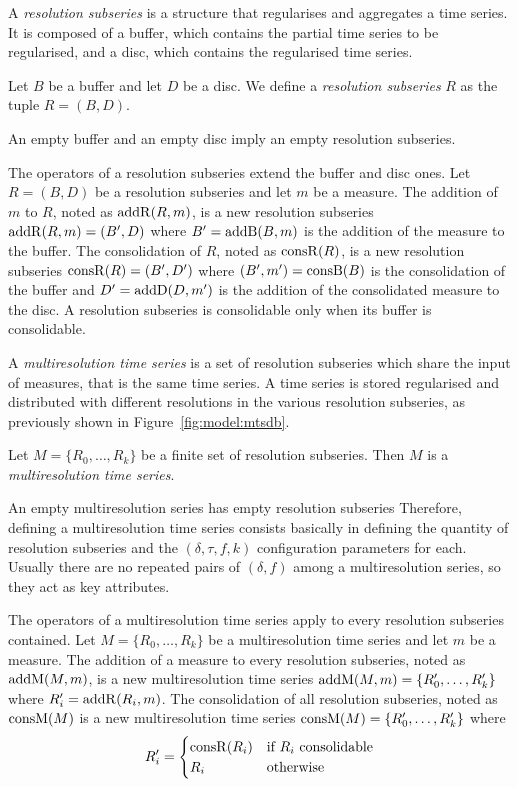 A \emph{resolution subseries} is a structure that regularises and
aggregates a time series. It is composed of a buffer, which contains
the partial time series to be regularised, and a disc, which contains
the regularised time series.
\begin{definition}%
  Let $B$ be a buffer and let $D$ be a disc.  We define a
  \emph{resolution subseries} $R$ as the tuple $R=(B,D)$.  
\end{definition}
 
An empty buffer and an empty disc imply an empty resolution subseries. 


The operators of a resolution subseries extend the buffer and disc
ones. Let $R=(B,D)$ be a resolution subseries and let $m$ be a
measure.  The addition of $m$ to $R$, noted as $\operatorname{addR}(R,m)$, is a new
resolution subseries $\operatorname{addR}(R,m)=(B',D)$ where $B'= \operatorname{addB}(B,m)$ is the
addition of the measure to the buffer.  The consolidation of $R$,
noted as $\operatorname{consR}(R)$, is a new resolution subseries
$\operatorname{consR}(R)=(B',D')$ where $(B',m') = \operatorname{consB}(B)$ is the consolidation
of the buffer and $D'= \operatorname{addD}(D,m')$ is the addition of the
consolidated measure to the disc. A resolution subseries is
consolidable only when its buffer is consolidable.




A \emph{multiresolution time series} is a set of resolution subseries
which share the input of measures, that is the same time series. A
time series is stored regularised and distributed with different
resolutions in the various resolution subseries, as previously shown
in Figure~\ref{fig:model:mtsdb}.
\begin{definition}%
  Let $M=\{R_0, \dots, R_k\}$ be a finite set of resolution
  subseries. Then $M$ is a \emph{multiresolution time series}.
\end{definition}


An empty multiresolution series has empty resolution subseries
Therefore, defining a multiresolution time series consists basically
in defining the quantity of resolution subseries and the
$(\delta,\tau,f,k)$ configuration parameters for each.  Usually there
are no repeated pairs of $(\delta,f)$ among a multiresolution
series, so they act as  key attributes.



The operators of a multiresolution time series apply to every
resolution subseries contained. Let $M=\{R_0,\allowbreak
\dots,\allowbreak R_k\}$ be a multiresolution time series and let $m$
be a measure.
%
The addition of a measure to every resolution subseries, noted as
$\operatorname{addM}(M,m)$, is a new multiresolution time series $\operatorname{addM}(M,m)=\{R'_0,
\dots,\allowbreak R'_k\}$ where $R'_i=\operatorname{addR}(R_i,m)$. The consolidation
of all resolution subseries, noted as $\operatorname{consM}(M)$ is a new
multiresolution time series $\operatorname{consM}(M)=\{R'_0,\allowbreak
\dots,\allowbreak R'_k\}$ where 
\[R'_i=
\begin{cases}
\operatorname{consR}(R_i) & \text{if } R_i \text{ consolidable}\\
 R_i & \text{otherwise}
\end{cases}
\]

